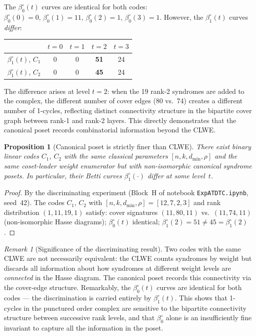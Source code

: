 \documentclass[11pt,twoside,leqno]{article}
\theoremstyle{definition}
\theoremstyle{plain}
\newtheorem{proposition}[definition]{Proposition}
\theoremstyle{remark}
\newtheorem{remark}[definition]{Remark}
\newcommand{\covrad}{\rho}
\begin{document}
The $\beta_0^\circ(t)$ curves are identical for both codes:
$\beta_0^\circ(0)=0,\,\beta_0^\circ(1)=11,\,\beta_0^\circ(2)=1,\,\beta_0^\circ(3)=1$.
However, the $\beta_1^\circ(t)$ curves \emph{differ}:
\begin{center}
\begin{tabular}{lcccc}
\toprule
 & $t=0$ & $t=1$ & $t=2$ & $t=3$ \\
\midrule
$\beta_1^\circ(t)$, $C_1$ & 0 & 0 & \textbf{51} & 24 \\
$\beta_1^\circ(t)$, $C_2$ & 0 & 0 & \textbf{45} & 24 \\
\bottomrule
\end{tabular}
\end{center}
The difference arises at level $t=2$: when the 19 rank-2 syndromes are added to the complex,
the different number of cover edges (80 vs.~74) creates a different number of 1-cycles,
reflecting distinct connectivity structure in the bipartite cover graph between rank-1 and rank-2 layers.
This directly demonstrates that the canonical poset records combinatorial information beyond the CLWE.

\begin{proposition}[Canonical poset is strictly finer than CLWE]\label{prop:finer}
There exist binary linear codes $C_1$, $C_2$ with the same classical parameters
$[n,k,d_{\min},\covrad]$ and the same coset-leader weight enumerator
but with non-isomorphic canonical syndrome posets. In particular, their Betti curves
$\beta_1^\circ(\cdot)$ differ at some level~$t$.
\end{proposition}

\begin{proof}
By the discriminating experiment (Block~H of notebook \texttt{ExpATDTC.ipynb}, seed~42).
The codes $C_1$, $C_2$ with $[n,k,d_{\min},\covrad]=[12,7,2,3]$ and rank distribution
$(1,11,19,1)$ satisfy: cover signatures $(11,80,11)$ vs.~$(11,74,11)$ (non-isomorphic
Hasse diagrams); $\beta_0^\circ(t)$ identical; $\beta_1^\circ(2)=51\ne 45=\beta_1^\circ(2)$.
\end{proof}

\begin{remark}[Significance of the discriminating result]
Two codes with the same CLWE are not necessarily equivalent: the CLWE counts syndromes by weight
but discards all information about how syndromes at different weight levels are \emph{connected}
in the Hasse diagram. The canonical poset records this connectivity via the cover-edge structure.
Remarkably, the $\beta_0^\circ(t)$ curves are identical for both codes — the discrimination is
carried entirely by $\beta_1^\circ(t)$. This shows that 1-cycles in the punctured order complex
are sensitive to the bipartite connectivity structure between successive rank levels, and that
$\beta_0^\circ$ alone is an insufficiently fine invariant to capture all the information in the poset.
\end{remark}
\end{document}
